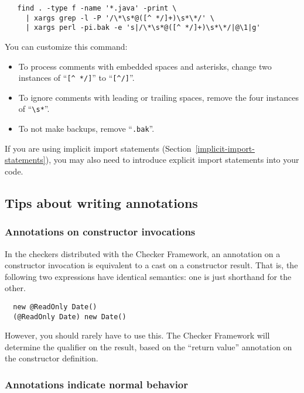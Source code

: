 \begin{Verbatim}
   find . -type f -name '*.java' -print \
     | xargs grep -l -P '/\*\s*@([^ */]+)\s*\*/' \
     | xargs perl -pi.bak -e 's|/\*\s*@([^ */]+)\s*\*/|@\1|g'
\end{Verbatim}

You can customize this command:
\begin{itemize}
\item
To process comments with embedded spaces and asterisks, change 
two instances of ``\verb|[^ */]|'' to ``\verb|[^/]|''.
\item
To ignore comments with leading or trailing spaces, remove the four
instances of ``\verb|\s*|''.  
\item
  To not make backups, remove
``\verb|.bak|''.
\end{itemize}


If you are using implicit import statements
(Section~\ref{implicit-import-statements}), you may also need to introduce
explicit import statements into your code.


\subsection{Tips about writing annotations\label{tips-about-writing-annotations}}

\subsubsection{Annotations on constructor invocations\label{annotations-on-constructor-invocations}}

In the checkers distributed with the Checker Framework, an annotation on a
constructor invocation is equivalent to a cast on a constructor result.
That is, the following two expressions have identical semantics:  one is
just shorthand for the other.

\begin{Verbatim}
  new @ReadOnly Date()
  (@ReadOnly Date) new Date()
\end{Verbatim}

However, you should rarely have to use this.  The Checker Framework will
determine the qualifier on the result, based on the ``return value''
annotation on the constructor definition.



\subsubsection{Annotations indicate normal behavior\label{annotate-normal-behavior}}

